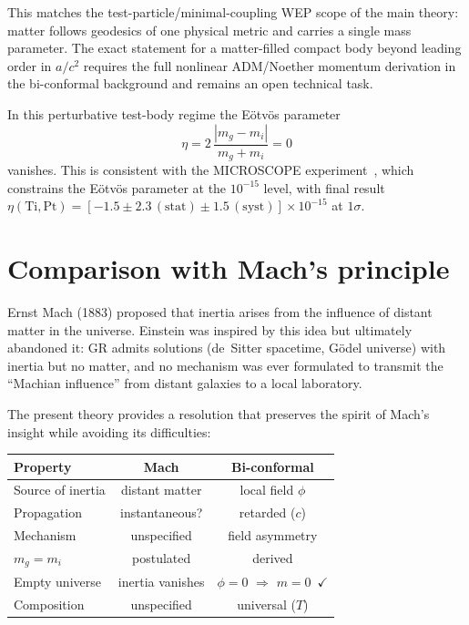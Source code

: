 \documentclass[11pt]{article}
\begin{document}
This matches the test-particle/minimal-coupling WEP
scope of the main theory: matter follows geodesics of
one physical metric and carries a single mass parameter.
The exact statement for a matter-filled compact body
beyond leading order in $a/c^2$ requires the full
nonlinear ADM/Noether momentum derivation in the
bi-conformal background and remains an open technical
task.

In this perturbative test-body regime the E\"otv\"os parameter
\begin{equation}\label{eq:eotvos}
  \eta = 2\,\frac{|m_g - m_i|}{m_g + m_i} = 0
\end{equation}
vanishes.  This is consistent with the MICROSCOPE
experiment~\cite{MICROSCOPE2022}, which constrains the
E\"otv\"os parameter at the $10^{-15}$ level, with final
result
$\eta(\mathrm{Ti},\mathrm{Pt}) =
[-1.5 \pm 2.3\,(\mathrm{stat})
 \pm 1.5\,(\mathrm{syst})]\times10^{-15}$ at $1\sigma$.

\section{Comparison with Mach's principle}
\label{sec:mach}

Ernst Mach (1883) proposed that inertia arises from
the influence of distant matter in the universe.
Einstein was inspired by this idea but ultimately
abandoned it: GR admits solutions (de~Sitter spacetime,
G\"odel universe) with inertia but no matter, and no
mechanism was ever formulated to transmit the ``Machian
influence'' from distant galaxies to a local laboratory.

The present theory provides a resolution that preserves
the spirit of Mach's insight while avoiding its
difficulties:

\begin{center}
\begin{tabular}{lcc}
\hline
Property & Mach & Bi-conformal \\
\hline
Source of inertia & distant matter & local field $\phi$ \\
Propagation & instantaneous? & retarded ($c$) \\
Mechanism & unspecified & field asymmetry \\
$m_g = m_i$ & postulated & derived \\
Empty universe & inertia vanishes & $\phi = 0$ $\Rightarrow$
  $m = 0$~$\checkmark$ \\
Composition & unspecified & universal ($T$) \\
\hline
\end{tabular}
\end{center}
\end{document}
